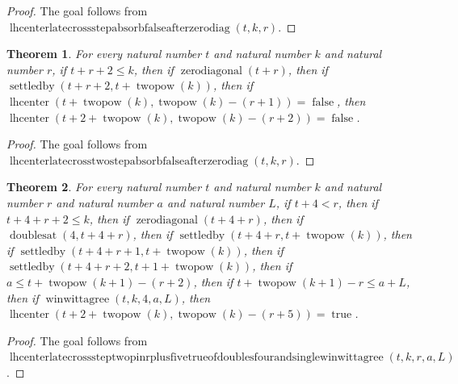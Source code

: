 \documentclass[11pt]{article}
\newtheorem{theorem}{Theorem}[section]
\theoremstyle{definition}
\begin{document}
\begin{proof}
The goal follows from \(\operatorname{lhcenterlatecrossstepabsorbfalseafterzerodiag}(t, k, r)\).
\end{proof}
\begin{theorem}
\label{ll:paper:lhcenter-late-cross-two-step-absorb-false-after-zero-diag}
For every natural number \(t\) and natural number \(k\) and natural number \(r\), if \(t + r + 2 \le k\), then if \(\operatorname{zerodiagonal}(t + r)\), then if \(\operatorname{settledby}(t + r + 2, t + \operatorname{twopow}(k))\), then if \(\operatorname{lhcenter}(t + \operatorname{twopow}(k), \operatorname{twopow}(k) - (r + 1)) = \operatorname{false}\), then \(\operatorname{lhcenter}(t + 2 + \operatorname{twopow}(k), \operatorname{twopow}(k) - (r + 2)) = \operatorname{false}\).
\end{theorem}
\begin{proof}
The goal follows from \(\operatorname{lhcenterlatecrosstwostepabsorbfalseafterzerodiag}(t, k, r)\).
\end{proof}
\begin{theorem}
\label{ll:paper:lhcenter-late-cross-step-two-pin-r-plus-five-true-of-doubles-four-and-single-winwittagree}
For every natural number \(t\) and natural number \(k\) and natural number \(r\) and natural number \(a\) and natural number \(L\), if \(t + 4 < r\), then if \(t + 4 + r + 2 \le k\), then if \(\operatorname{zerodiagonal}(t + 4 + r)\), then if \(\operatorname{doublesat}(4, t + 4 + r)\), then if \(\operatorname{settledby}(t + 4 + r, t + \operatorname{twopow}(k))\), then if \(\operatorname{settledby}(t + 4 + r + 1, t + \operatorname{twopow}(k))\), then if \(\operatorname{settledby}(t + 4 + r + 2, t + 1 + \operatorname{twopow}(k))\), then if \(a \le t + \operatorname{twopow}(k + 1) - (r + 2)\), then if \(t + \operatorname{twopow}(k + 1) - r \le a + L\), then if \(\operatorname{winwittagree}(t, k, 4, a, L)\), then \(\operatorname{lhcenter}(t + 2 + \operatorname{twopow}(k), \operatorname{twopow}(k) - (r + 5)) = \operatorname{true}\).
\end{theorem}
\begin{proof}
The goal follows from \(\operatorname{lhcenterlatecrosssteptwopinrplusfivetrueofdoublesfourandsinglewinwittagree}(t, k, r, a, L)\).
\end{proof}
\end{document}
